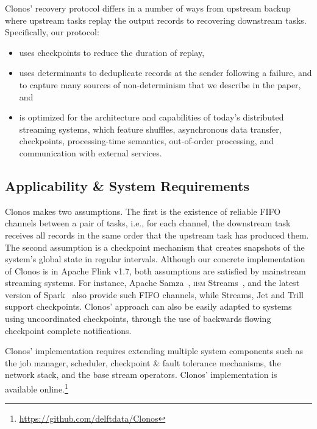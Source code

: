 \documentclass[sigconf]{acmart}
\newcounter{MariosNOC}
\newcommand{\marios}[1]{\noindent\textcolor{blue}{\small \bf [Marios\#\arabic{MariosNOC}\stepcounter{MariosNOC}: #1]}}
\newcounter{PedroNOC}
\newcommand{\pedro}[1]{\noindent\textcolor{green}{\small \bf [Pedro\#\arabic{PedroNOC}\stepcounter{PedroNOC}: #1]}}
\begin{document}
\noindent Clonos' recovery protocol differs in a number of ways
from upstream backup~\cite{Hwang2005HAA} where upstream tasks replay the output records to recovering downstream tasks.
Specifically, our protocol:
\vspace{-2mm}
\begin{itemize}
\item uses checkpoints to reduce the duration of replay, 
\item uses determinants to deduplicate records at the sender following a failure, and to capture many sources of non-determinism that we describe in the paper, and
\item is optimized for the architecture and capabilities of
today's distributed streaming systems, which feature shuffles, asynchronous data transfer,
checkpoints, processing-time semantics, out-of-order processing, and communication with external services.
\end{itemize}

\subsection{Applicability \& System Requirements}
Clonos makes two assumptions. The first is the existence of reliable FIFO channels between a pair of tasks, i.e., for each channel, the downstream task receives all records in the same order that the upstream task has produced them. 
The second assumption is a checkpoint mechanism that creates snapshots of the system's global state in regular intervals. Although our concrete implementation of Clonos is in Apache Flink v1.7, both assumptions are satisfied by mainstream streaming systems. For instance, Apache Samza~\cite{NoghabiPP17}, \textsc{ibm} Streams~\cite{SilvaZD16}, and the latest version of Spark~\cite{ArmbrustDT18} also provide such FIFO channels, while Streams, Jet and Trill support checkpoints.
Clonos' approach can also be easily adapted to systems using uncoordinated checkpoints, through the use of backwards flowing checkpoint complete notifications.


Clonos' implementation requires extending multiple system components such as the job manager, scheduler, checkpoint \& fault tolerance mechanisms, the network stack, and the base stream operators.
Clonos' implementation is available online.\footnote{\url{https://github.com/delftdata/Clonos}}
\end{document}
